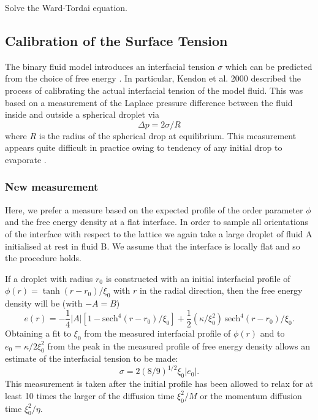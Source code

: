 Solve the Ward-Tordai equation.

\subsection{Calibration of the Surface Tension}

The binary fluid model introduces an interfacial tension $\sigma$ which
can be predicted from the choice of free energy \cite{swift,kendon}.
In particular, Kendon et al. 2000 described the process of calibrating
the actual interfacial tension of the model fluid. This was based on
a measurement of the Laplace pressure difference between the fluid
inside and outside a spherical droplet via
\begin{equation}
\Delta p = 2 \sigma / R
\end{equation}
where $R$ is the radius of the spherical drop at equilibrium. This
measurement appears quite difficult in practice owing to tendency of
any initial drop to evaporate \cite{yue2007}.

\subsubsection{New measurement}

Here, we prefer a measure based on the expected profile of the
order parameter $\phi$ and the free energy density at a flat interface.
In order to sample all orientations of the interface with respect to
the lattice we again take a large droplet of fluid A initialised at
rest in fluid B. We assume that the interface is locally flat and so
the procedure holds.

If a droplet with radius $r_0$ is constructed with an initial interfacial
profile of $\phi(r) = \tanh{(r - r_0) / \xi_0}$
with $r$ in the radial direction,  then the free energy density will be
(with $-A = B$)
\begin{equation}
 e(r) = -{\scriptstyle \frac{1}{4}} |A| [1 - \mathrm{sech}^4 (r-r_0)/\xi_0]
+ {\scriptstyle \frac{1}{2}}
 (\kappa/\xi_0^2)\, \mathrm{sech}^4{(r-r_0)/\xi_0}.
\end{equation}
Obtaining a fit to $\xi_0$ from the measured interfacial profile of
$\phi (r)$ and to $ e_0 = \kappa / 2 \xi_0^2$ from the peak in the measured
profile of free energy
density allows an estimate of the interfacial tension to be made:
\begin{equation}
\sigma = 2(8/9)^{1/2} \xi_0 |e_0|.
\end{equation}
This measurement is taken after the initial profile has been allowed
to relax for at least 10 times the larger of the diffusion time
$\xi_0^2 / M$ or the momentum diffusion time $\xi_0^2 / \eta$.


